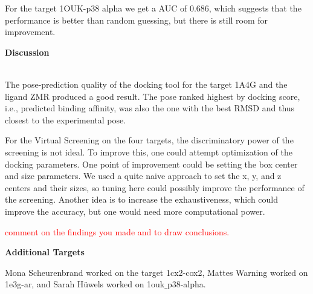 \documentclass[a4paper,10pt]{article}
\begin{document}
For the target 1OUK-p38 alpha we get a AUC of 0.686, which suggests that the performance is better than random guessing, but there is still room for improvement.

\begin{large}
	\vspace{0.5cm}
	\textbf{Discussion}
\end{large}	\\ [1mm]

The pose-prediction quality of the docking tool for the target 1A4G and the ligand ZMR produced a good result. The pose ranked highest by docking score, i.e., predicted binding affinity, was also  the one with the best RMSD and thus closest to the experimental pose. 

For the Virtual Screening on the four targets, the discriminatory power of the screening is not ideal. To improve this, one could attempt optimization of the docking parameters. One point of improvement could be setting the box center and size parameters. We used a quite naive approach to set the x, y, and z centers and their sizes, so tuning here could possibly improve the performance of the screening. Another idea is to increase the exhaustiveness, which could improve the accuracy, but one would need more computational power.

\textcolor{red}{comment on the findings you made and to draw conclusions.}



\textbf{Additional Targets}

Mona Scheurenbrand worked on the target 1cx2-cox2, Mattes Warning worked on 1e3g-ar, and Sarah Hüwels worked on 1ouk$\_$p38-alpha.



\end{document}
